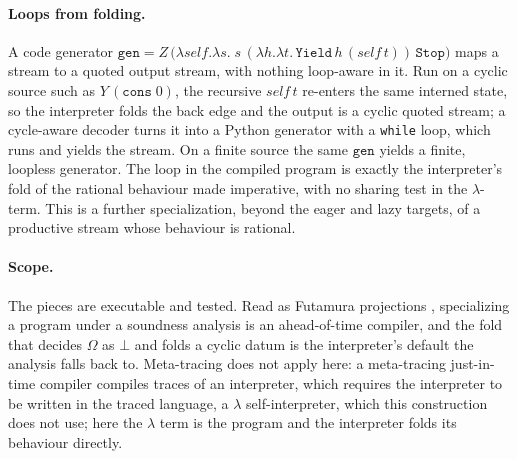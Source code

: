 \paragraph{Loops from folding.}
A code generator
$\mathtt{gen} = Z\,\big(\lambda\mathit{self}.\lambda s.\;
s\,(\lambda h.\lambda t.\,\mathtt{Yield}\,h\,(\mathit{self}\,t))\,\mathtt{Stop}\big)$
maps a stream to a quoted output stream, with nothing loop-aware in it. Run on a cyclic source such
as $Y\,(\mathtt{cons}\;0)$, the recursive $\mathit{self}\,t$ re-enters the same interned state, so
the interpreter folds the back edge and the output is a cyclic quoted stream; a cycle-aware decoder
turns it into a Python generator with a \texttt{while} loop, which runs and yields the stream. On a
finite source the same $\mathtt{gen}$ yields a finite, loopless generator. The loop in the compiled
program is exactly the interpreter's fold of the rational behaviour made imperative, with no sharing
test in the $\lambda$-term. This is a further specialization, beyond the eager and lazy targets, of a
productive stream whose behaviour is rational.

\paragraph{Scope.}
The pieces are executable and tested. Read as Futamura projections ,
specializing a program under a soundness analysis is an ahead-of-time compiler, and the fold that
decides $\Omega$ as $\bot$ and folds a cyclic datum is the interpreter's default the analysis falls
back to. Meta-tracing does not apply here: a meta-tracing just-in-time compiler
 compiles traces of an interpreter, which requires the interpreter to be
written in the traced language, a $\lambda$ self-interpreter, which this construction does not use;
here the $\lambda$ term is the program and the interpreter folds its behaviour directly.

